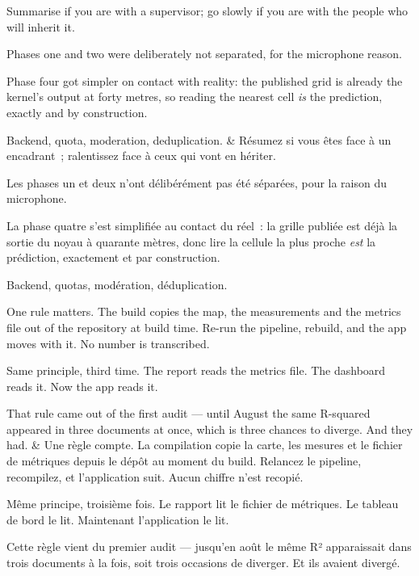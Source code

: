 \documentclass[10pt,a4paper]{article}
\begin{document}
\begin{say}
Summarise if you are with a supervisor; go slowly if you are with the people who
will inherit it. 

Phases one and two were deliberately not separated, for the microphone reason.

Phase four got simpler on contact with reality: the published grid is already the
kernel's output at forty metres, so reading the nearest cell \emph{is} the
prediction, exactly and by construction.

 Backend, quota,
moderation, deduplication.
&
Résumez si vous êtes face à un encadrant~; ralentissez face à ceux qui vont en
hériter. 

Les phases un et deux n'ont délibérément pas été séparées, pour la raison du
microphone.

La phase quatre s'est simplifiée au contact du réel~: la grille publiée est déjà la
sortie du noyau à quarante mètres, donc lire la cellule la plus proche \emph{est}
la prédiction, exactement et par construction.

 Backend,
quotas, modération, déduplication.
\end{say}

\begin{say}
One rule matters.  The
build copies the map, the measurements and the metrics file out of the repository
at build time. Re-run the pipeline, rebuild, and the app moves with it. No number
is transcribed.

Same principle, third time. The report reads the metrics file. The dashboard reads
it. Now the app reads it. 

That rule came out of the first audit --- until August the same R-squared appeared
in three documents at once, which is three chances to diverge. And they had.
&
Une règle compte.  La
compilation copie la carte, les mesures et le fichier de métriques depuis le dépôt
au moment du build. Relancez le pipeline, recompilez, et l'application suit. Aucun
chiffre n'est recopié.

Même principe, troisième fois. Le rapport lit le fichier de métriques. Le tableau
de bord le lit. Maintenant l'application le lit. 

Cette règle vient du premier audit --- jusqu'en août le même R² apparaissait dans
trois documents à la fois, soit trois occasions de diverger. Et ils avaient
divergé.
\end{say}
\end{document}
